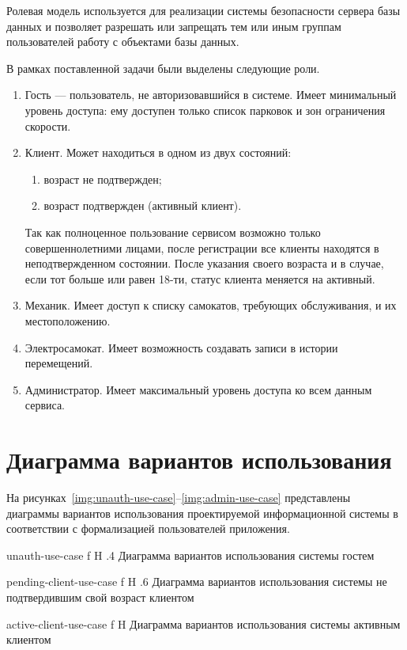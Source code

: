 Ролевая модель используется для реализации системы безопасности сервера базы данных и позволяет разрешать или запрещать тем или иным группам пользователей работу с объектами базы данных.

В рамках поставленной задачи были выделены следующие роли.

\begin{enumerate}
	\item Гость --- пользователь, не авторизовавшийся в системе. Имеет минимальный уровень доступа: ему доступен только список парковок и зон ограничения скорости.
	\item Клиент. Может находиться в одном из двух состояний:
	      \begin{enumerate}
		      \item возраст не подтвержден;
		      \item возраст подтвержден (активный клиент).
	      \end{enumerate}
	      Так как полноценное пользование сервисом возможно только совершеннолетними лицами, после регистрации все клиенты находятся в неподтвержденном состоянии. После указания своего возраста и в случае, если тот больше или равен 18-ти, статус клиента меняется на активный.
	\item Механик. Имеет доступ к списку самокатов, требующих обслуживания, и их местоположению.
	\item Электросамокат. Имеет возможность создавать записи в истории перемещений.
	\item Администратор. Имеет максимальный уровень доступа ко всем данным сервиса.
\end{enumerate}

\pagebreak
\section{Диаграмма вариантов использования}

На рисунках~\ref{img:unauth-use-case}--\ref{img:admin-use-case} представлены диаграммы вариантов использования проектируемой информационной системы в соответствии с формализацией пользователей приложения.

{unauth-use-case}
{f}
{H}
{.4\textwidth}
{Диаграмма вариантов использования системы гостем}

{pending-client-use-case}
{f}
{H}
{.6\textwidth}
{Диаграмма вариантов использования системы не подтвердившим свой возраст клиентом}

{active-client-use-case}
{f}
{H}
{\textwidth}
{Диаграмма вариантов использования системы активным клиентом}

